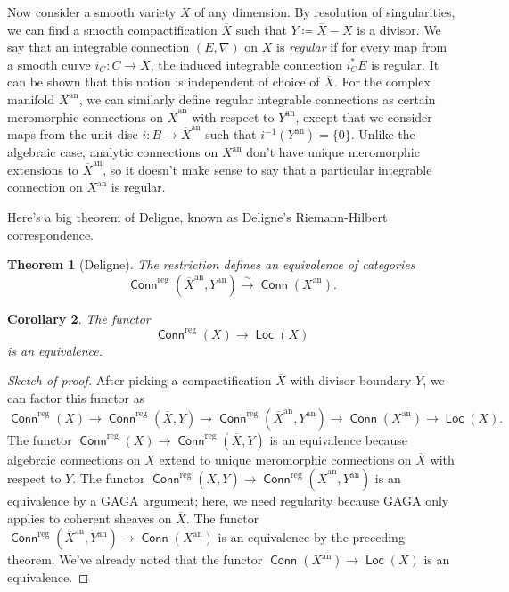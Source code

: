 \documentclass[leqno, openany]{memoir}
\newtheorem{thm}{Theorem}[section]
\newtheorem{cor}[thm]{Corollary}
\theoremstyle{definition}
\theoremstyle{remark}
\theoremstyle{plain}
\theoremstyle{definition}
\theoremstyle{remark}
\newcommand{\mr}[1]{\mathrm{#1}}
\newcommand{\ms}[1]{\mathsf{#1}}
\DeclareMathOperator{\Conn}{\ms{Conn}}
\DeclareMathOperator{\Loc}{\ms{Loc}}
\DeclareMathOperator{\reg}{reg}
\begin{document}
Now consider a smooth variety $X$ of any dimension. By resolution of singularities, we can find a smooth compactification $\overline{X}$ such that $Y \coloneqq \overline{X} - X$ is a divisor. We say that an integrable connection $(E,\nabla)$ on $X$ is \textit{regular} if for every map from a smooth curve $i_C: C \to X$, the induced integrable connection $i_C^*E$ is regular. It can be shown that this notion is independent of choice of $\overline{X}$. For the complex manifold $X^{\mr{an}}$, we can similarly define regular integrable connections as certain meromorphic connections on $\overline{X}^{\mr{an}}$ with respect to $Y^{\mr{an}}$, except that we consider maps from the unit disc $i: B \to \overline{X}^{\mr{an}}$ such that $i^{-1}(Y^{\mr{an}}) = \{0\}$. Unlike the algebraic case, analytic connections on $X^{\mr{an}}$ don't have unique meromorphic extensions to $\overline{X}^{\mr{an}}$, so it doesn't make sense to say that a particular integrable connection on $X^{\mr{an}}$ is regular.

Here's a big theorem of Deligne, known as Deligne's Riemann-Hilbert correspondence.

\begin{thm}[Deligne]
The restriction defines an equivalence of categories $$\Conn^{\reg}(\overline{X}^{\mr{an}},Y^{\mr{an}}) \xrightarrow[]{\sim} \Conn(X^{\mr{an}}).$$
\end{thm}

\begin{cor}
The functor $$\Conn^{\reg}(X) \to \Loc(X)$$ is an equivalence.
\end{cor}

\begin{proof}[Sketch of proof]
After picking a compactification $\overline{X}$ with divisor boundary $Y$, we can factor this functor as $$\Conn^{\reg}(X) \to \Conn^{\reg}(\overline{X},Y) \to \Conn^{\reg}(\overline{X}^{\mr{an}},Y^{\mr{an}}) \to \Conn(X^{\mr{an}}) \to \Loc(X).$$ The functor $\Conn^{\reg}(X) \to \Conn^{\reg}(\overline{X},Y)$ is an equivalence because algebraic connections on $X$ extend to unique meromorphic connections on $\overline{X}$ with respect to $Y$. The functor $\Conn^{\reg}(\overline{X},Y) \to \Conn^{\reg}(\overline{X}^{\mr{an}},Y^{\mr{an}})$ is an equivalence by a GAGA argument; here, we need regularity because GAGA only applies to coherent sheaves on $\overline{X}$. The functor $\Conn^{\reg}(\overline{X}^{\mr{an}},Y^{\mr{an}}) \to \Conn(X^{\mr{an}})$ is an equivalence by the preceding theorem. We've already noted that the functor $\Conn(X^{\mr{an}}) \to \Loc(X)$ is an equivalence.

\end{proof}
\end{document}
